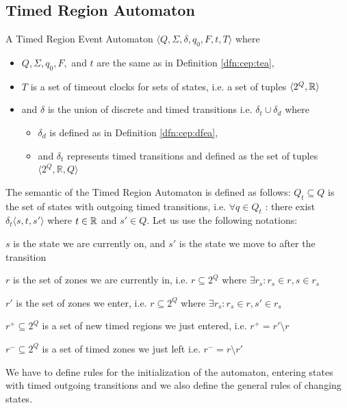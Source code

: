 		\subsection{Timed Region Automaton}
			\begin{dfn}
				\label{dfn:cep:TREA}
				A Timed Region Event Automaton $\langle Q,\Sigma,\delta,q_0, F, t, T \rangle$ where
				\begin{itemize}
					\item $Q, \Sigma, q_0, F,$ and  $t$ are the same as in Definition \ref{dfn:cep:tea},
					\item $T$ is a set of timeout clocks for sets of states, i.e. a set of tuples $\langle 2^Q, \mathbb{R} \rangle$
					\item and $\delta$ is the union of discrete and timed transitions i.e. $\delta_t \cup \delta_d$ where
					\begin{itemize}
						\item $\delta_d$ is defined as in Definition \ref{dfn:cep:dfea},
						\item and $\delta_t$ represents timed transitions and defined as the set of tuples $\langle 2^Q , \mathbb{R} , Q \rangle$ 
					\end{itemize}
				\end{itemize}
			\end{dfn}
			
			The semantic of the Timed Region Automaton is defined as follows:
			$Q_t \subseteq Q$ is the set of states with outgoing timed transitions, 
			i.e. $\forall q \in Q_t$ : there exist $ \delta_t\langle s, t, s' \rangle$ where $t \in \mathbb{R}$ and $s' \in Q$.
			Let us use the following notations: 
		
			$s$ is the state we are currently on, and $s'$ is the state we move to after the transition
		
			$r$ is the set of zones we are currently in, 
			i.e. $r \subseteq 2^Q$ where $\exists r_s : r_s \in r, s \in r_s $ 
			
			$r'$ is the set of zones we enter,
			i.e. $r \subseteq 2^Q$ where $\exists r_s :  r_s \in r, s' \in r_s $ 
			
			$r^+ \subseteq 2^Q$ is a set of new timed regions we just entered,
			i.e. $r^+ = r' \setminus r$ 
			
			$r^- \subseteq 2^Q$ is a set of timed zones we just left
			i.e. $r^- = r \setminus r'$
		
			We have to define rules for the initialization of the automaton,
			entering states with timed outgoing transitions 
			and we also define the general rules of changing states. 
			
